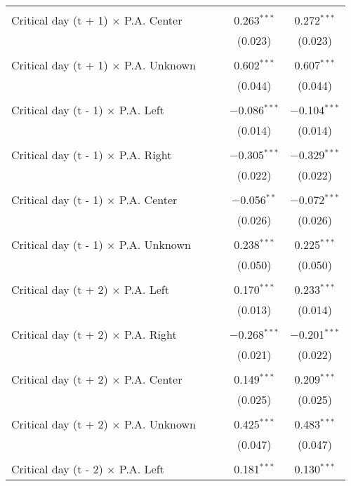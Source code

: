 \documentclass[
]{article}
\begin{document}
\begin{table}[!htbp]
{\begin{tabular}{@{\extracolsep{5pt}}lcccc}
  & & & & \\ 
 Critical day (t + 1) $\times$ P.A. Center &  &  & 0.263$^{***}$ & 0.272$^{***}$ \\ 
  &  &  & (0.023) & (0.023) \\ 
  & & & & \\ 
 Critical day (t + 1) $\times$ P.A. Unknown &  &  & 0.602$^{***}$ & 0.607$^{***}$ \\ 
  &  &  & (0.044) & (0.044) \\ 
  & & & & \\ 
 Critical day (t - 1) $\times$ P.A. Left &  &  & $-$0.086$^{***}$ & $-$0.104$^{***}$ \\ 
  &  &  & (0.014) & (0.014) \\ 
  & & & & \\ 
 Critical day (t - 1) $\times$ P.A. Right &  &  & $-$0.305$^{***}$ & $-$0.329$^{***}$ \\ 
  &  &  & (0.022) & (0.022) \\ 
  & & & & \\ 
 Critical day (t - 1) $\times$ P.A. Center &  &  & $-$0.056$^{**}$ & $-$0.072$^{***}$ \\ 
  &  &  & (0.026) & (0.026) \\ 
  & & & & \\ 
 Critical day (t - 1) $\times$ P.A. Unknown &  &  & 0.238$^{***}$ & 0.225$^{***}$ \\ 
  &  &  & (0.050) & (0.050) \\ 
  & & & & \\ 
 Critical day (t + 2) $\times$ P.A. Left &  &  & 0.170$^{***}$ & 0.233$^{***}$ \\ 
  &  &  & (0.013) & (0.014) \\ 
  & & & & \\ 
 Critical day (t + 2) $\times$ P.A. Right &  &  & $-$0.268$^{***}$ & $-$0.201$^{***}$ \\ 
  &  &  & (0.021) & (0.022) \\ 
  & & & & \\ 
 Critical day (t + 2) $\times$ P.A. Center &  &  & 0.149$^{***}$ & 0.209$^{***}$ \\ 
  &  &  & (0.025) & (0.025) \\ 
  & & & & \\ 
 Critical day (t + 2) $\times$ P.A. Unknown &  &  & 0.425$^{***}$ & 0.483$^{***}$ \\ 
  &  &  & (0.047) & (0.047) \\ 
  & & & & \\ 
 Critical day (t - 2) $\times$ P.A. Left &  &  & 0.181$^{***}$ & 0.130$^{***}$ \\ 

\end{tabular}}
\end{table}
\end{document}
